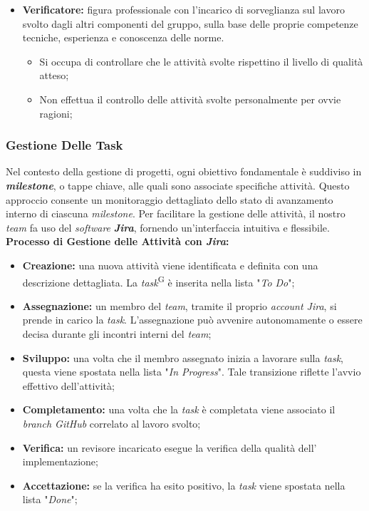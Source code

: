 \documentclass[5pt]{article}
\begin{document}
\begin{itemize}
    \item  \textbf{Verificatore:} figura professionale con l’incarico di sorveglianza sul lavoro svolto dagli altri componenti del gruppo, sulla base delle proprie competenze tecniche, esperienza e conoscenza delle norme.
        \begin{itemize}
            \item Si occupa di controllare che le attività svolte rispettino il livello di qualità atteso;
            \item Non effettua il controllo delle attività svolte personalmente per ovvie ragioni;
        \end{itemize}
        
\end{itemize}

\subsubsection{Gestione Delle Task}
Nel contesto della gestione di progetti, ogni obiettivo fondamentale è suddiviso in \textbf{\textit{milestone}}, o tappe chiave, alle quali sono associate specifiche attività. Questo approccio consente un monitoraggio dettagliato dello stato di avanzamento interno di ciascuna \textit{milestone}. Per facilitare la gestione delle attività, il nostro \textit{team} fa uso del \textit{software} \textbf{\textit{Jira}}, fornendo un'interfaccia intuitiva e flessibile.\\
\textbf{Processo di Gestione delle Attività con \textit{Jira}:}
\begin{itemize}
    \item \textbf{Creazione:} una nuova attività viene identificata e definita con una descrizione dettagliata. La \textit{task}\textsuperscript{G} è inserita nella lista "\textit{To Do}";
    \item \textbf{Assegnazione:} un membro del \textit{team}, tramite il proprio \textit{account Jira}, si prende in carico la \textit{task}. L'assegnazione può avvenire autonomamente o essere decisa durante gli incontri interni del \textit{team};
    \item \textbf{Sviluppo:} una volta che il membro assegnato inizia a lavorare sulla \textit{task}, questa viene spostata nella lista "\textit{In Progress}". Tale transizione riflette l'avvio effettivo dell'attività;
    \item \textbf{Completamento:} una volta che la \textit{task} è completata viene associato il \textit{branch GitHub} correlato al lavoro svolto;
    \item \textbf{Verifica:} un revisore incaricato esegue la verifica della qualità dell' implementazione;
    \item \textbf{Accettazione:} se la verifica ha esito positivo, la \textit{task} viene spostata nella lista "\textit{Done}";
\end{itemize}
\end{document}
